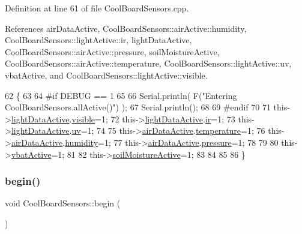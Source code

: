 Definition at line 61 of file Cool\+Board\+Sensors.\+cpp.



References air\+Data\+Active, Cool\+Board\+Sensors\+::air\+Active\+::humidity, Cool\+Board\+Sensors\+::light\+Active\+::ir, light\+Data\+Active, Cool\+Board\+Sensors\+::air\+Active\+::pressure, soil\+Moisture\+Active, Cool\+Board\+Sensors\+::air\+Active\+::temperature, Cool\+Board\+Sensors\+::light\+Active\+::uv, vbat\+Active, and Cool\+Board\+Sensors\+::light\+Active\+::visible.


\begin{DoxyCode}
62 \{
63 
64 \textcolor{preprocessor}{#if DEBUG == 1 }
65 
66     Serial.println( F(\textcolor{stringliteral}{"Entering CoolBoardSensors.allActive()"}) );
67     Serial.println();
68 
69 \textcolor{preprocessor}{#endif}
70     
71     this->\hyperlink{classCoolBoardSensors_ac4deb1cf41bac8b91c780c92fab00ba4}{lightDataActive}.\hyperlink{structCoolBoardSensors_1_1lightActive_abcbba296b6a95e67c0cd2555d9dd50c7}{visible}=1;
72     this->\hyperlink{classCoolBoardSensors_ac4deb1cf41bac8b91c780c92fab00ba4}{lightDataActive}.\hyperlink{structCoolBoardSensors_1_1lightActive_a67700895349b95ceb263f1a6da756315}{ir}=1;
73     this->\hyperlink{classCoolBoardSensors_ac4deb1cf41bac8b91c780c92fab00ba4}{lightDataActive}.\hyperlink{structCoolBoardSensors_1_1lightActive_a949a7aaf5166d981de8fe0fd93da20d6}{uv}=1;    
74 
75     this->\hyperlink{classCoolBoardSensors_abff8dfeccb2f7689847bb64d5f1cd31e}{airDataActive}.\hyperlink{structCoolBoardSensors_1_1airActive_a9a6633c426b0508e30ebc1832ec6d745}{temperature}=1;
76     this->\hyperlink{classCoolBoardSensors_abff8dfeccb2f7689847bb64d5f1cd31e}{airDataActive}.\hyperlink{structCoolBoardSensors_1_1airActive_ae5740445054b27415e22f450576accb7}{humidity}=1;
77     this->\hyperlink{classCoolBoardSensors_abff8dfeccb2f7689847bb64d5f1cd31e}{airDataActive}.\hyperlink{structCoolBoardSensors_1_1airActive_ab200826a70d1dc9945f5efb6b9c732ed}{pressure}=1;
78 
79 
80     this->\hyperlink{classCoolBoardSensors_af5039ad760b0ff0aa7eee16c55e81702}{vbatActive}=1;
81 
82     this->\hyperlink{classCoolBoardSensors_a31983eecc0f9cd000e1f912206ea4dc8}{soilMoistureActive}=1;
83     
84 
85 
86 \}
\end{DoxyCode}
\mbox{\label{classCoolBoardSensors_a97095823ef7c8f5290812f1405b966b3}} 
\subsubsection{\texorpdfstring{begin()}{begin()}}
{\footnotesize\ttfamily void Cool\+Board\+Sensors\+::begin (\begin{DoxyParamCaption}{ }\end{DoxyParamCaption})}

